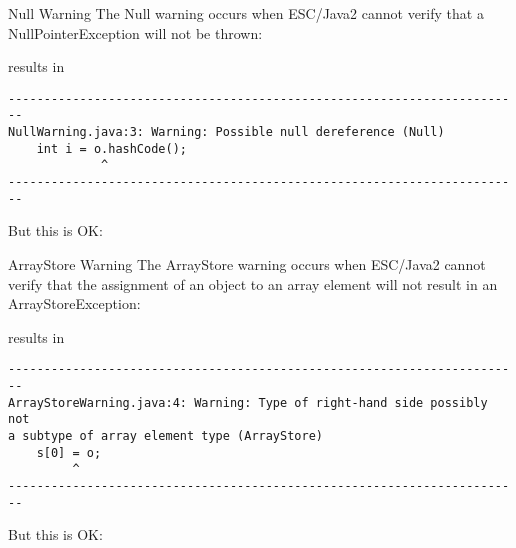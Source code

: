 \documentclass[
pdf,
nocolorBG,
slideColor,
cok,
]{prosper}
\begin{document}
\begin{slide}{Null Warning}
\vspace*{-9ex}
The Null warning occurs when ESC/Java2 cannot verify that a NullPointerException will not be thrown:
{\tiny
\begin{figure*}

\end{figure*}
}
results in
{\tiny
\begin{verbatim}
------------------------------------------------------------------------
NullWarning.java:3: Warning: Possible null dereference (Null)
    int i = o.hashCode();
             ^
------------------------------------------------------------------------
\end{verbatim}
}

But this is OK:
{\tiny
\begin{figure*}

\end{figure*}
}


\end{slide}
\begin{slide}{ArrayStore Warning}
\tiny
\vspace*{-12ex}
The ArrayStore warning occurs when ESC/Java2 cannot verify that the assignment of an object 
to an array element will not result in an ArrayStoreException:
\vspace*{-1ex}
{\tiny
\begin{figure*}

\end{figure*}
}
\vspace*{-2ex}
results in
\vspace*{-1ex}
{\tiny
\begin{verbatim}
------------------------------------------------------------------------
ArrayStoreWarning.java:4: Warning: Type of right-hand side possibly not 
a subtype of array element type (ArrayStore)
    s[0] = o;
         ^
------------------------------------------------------------------------
\end{verbatim}
}
\vspace*{-1ex}
But this is OK:
\vspace*{-1ex}
{\tiny
\begin{figure*}

\end{figure*}
}
\end{slide}
\end{document}
